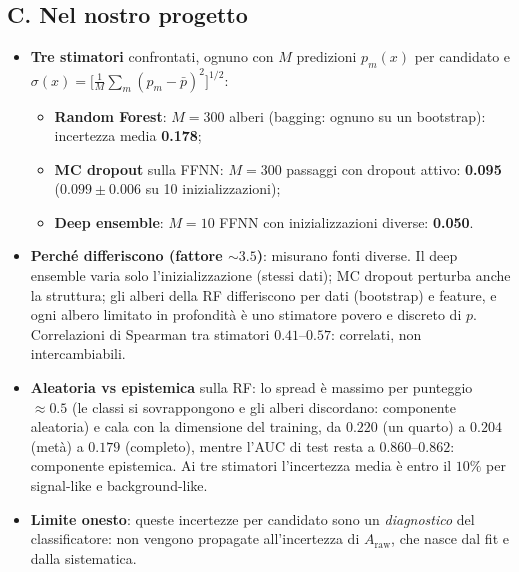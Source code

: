 \documentclass[11pt,a4paper]{article}
\newcommand{\Araw}{A_{\mathrm{raw}}}
\begin{document}
\subsection*{C. Nel nostro progetto}
\begin{itemize}
\item \textbf{Tre stimatori} confrontati, ognuno con $M$ predizioni $p_m(x)$ per candidato e $\sigma(x)=\big[\frac1M\sum_m(p_m-\bar p)^2\big]^{1/2}$:
 \begin{itemize}
 \item \textbf{Random Forest}: $M=300$ alberi (bagging: ognuno su un bootstrap): incertezza media \textbf{0.178};
 \item \textbf{MC dropout} sulla FFNN: $M=300$ passaggi con dropout attivo: \textbf{0.095} ($0.099\pm0.006$ su 10 inizializzazioni);
 \item \textbf{Deep ensemble}: $M=10$ FFNN con inizializzazioni diverse: \textbf{0.050}.
 \end{itemize}
\item \textbf{Perch\'e differiscono (fattore $\sim3.5$)}: misurano fonti diverse. Il deep ensemble varia solo l'inizializzazione (stessi dati); MC dropout perturba anche la struttura; gli alberi della RF differiscono per dati (bootstrap) e feature, e ogni albero limitato in profondit\`a \`e uno stimatore povero e discreto di $p$. Correlazioni di Spearman tra stimatori $0.41$--$0.57$: correlati, non intercambiabili.
\item \textbf{Aleatoria vs epistemica} sulla RF: lo spread \`e massimo per punteggio $\approx0.5$ (le classi si sovrappongono e gli alberi discordano: componente aleatoria) e cala con la dimensione del training, da $0.220$ (un quarto) a $0.204$ (met\`a) a $0.179$ (completo), mentre l'AUC di test resta a $0.860$--$0.862$: componente epistemica. Ai tre stimatori l'incertezza media \`e entro il $10\%$ per signal-like e background-like.
\item \textbf{Limite onesto}: queste incertezze per candidato sono un \emph{diagnostico} del classificatore: non vengono propagate all'incertezza di $\Araw$, che nasce dal fit e dalla sistematica.
\end{itemize}
\end{document}
